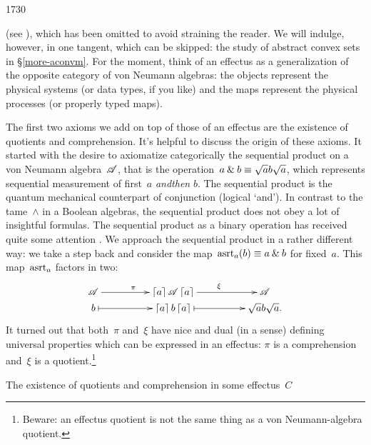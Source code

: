 \begin{parsec}{1730}
\begin{point}{30}
    (see \cite{effintro}), which has been omitted
    to avoid straining the reader.
    We will indulge, however,
    in one tangent,
    which can be skipped:
    the study of abstract convex sets in
    \S\ref{more-aconvm}.
For the moment, think of an effectus as a generalization
    of the opposite category of von Neumann algebras:
    the objects represent the physical systems
    (or data types, if you like)
    and the maps represent the physical processes
    (or properly typed maps).
\end{point}
\begin{point}{40}%
The first two axioms we add on top of those of an effectus
    are the existence of quotients and comprehension.
It's helpful to discuss the origin of these axioms.
It started with the desire to axiomatize categorically
    the sequential product on a von Neumann algebra~$\mathscr{A}$,
    that is the operation~$a \mathbin{\&} b \equiv  \sqrt{a} b \sqrt{a}$,
    which represents sequential measurement
    of first~$a$ \emph{andthen} $b$.
The sequential product is the quantum mechanical counterpart
    of conjunction (logical `and').
In  contrast to the tame~$\wedge$ in a Boolean algebras,
    the sequential product does not obey a lot of insightful
    formulas.
The sequential product as a binary operation
        has received quite some attention \cite{gudder2008characterization,gheondea2004sequential,gudder2001sequential,li2011sequential,gudder2005open,shen2009not,gudder2005uniqueness,jun2009remarks,weihua2009uniqueness,tkadlec2008atomic,jia2010entropy,arias2004almost}.
We approach the sequential product in a rather different way:
    we take a step back and
    consider the map~$\mathrm{asrt}_a(b) \equiv  a \mathbin{\&} b$
        for fixed~$a$.
    This map~$\mathrm{asrt}_a$ factors in two:
\begin{equation*}
    \xymatrix@C+2pc@R-2pc{
        \scrA \ar[r]^\pi & \ceil{a} \scrA \ceil{a} \ar[r]^\xi
        & \scrA \\
        b \ar@{|->}[r] & \ceil{a}b\ceil{a}
            \ar@{|->}[r] & \sqrt{a}b\sqrt{a}.
    }
\end{equation*}
It turned out that both~$\pi$ and~$\xi$ have
    nice and dual (in a sense) defining universal properties
    which can be expressed in an effectus:
    $\pi$ is a comprehension and~$\xi$ is a quotient.\footnote{%
            Beware: an effectus quotient is not the same thing
        as a von Neumann-algebra quotient.}
\end{point}
\begin{point}{50}%
The existence of quotients and comprehension in some effectus~$C$

\end{point}
\end{parsec}
